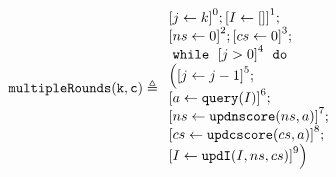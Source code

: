 %
\begin{figure}
\centering
\begin{subfigure}{0.3\textwidth}
    $
\kw{multipleRounds(k, c)} \triangleq
\begin{array}{l}
    \clabel{\assign{j}{k}}^0;
    \clabel{\assign{I}{[]}}^1; \\
    \clabel{\assign{ns}{0}}^2; 
    \clabel{\assign{cs}{0}}^3; \\
    \ewhile ~ \clabel{j > 0}^{4} ~ \edo ~ \\
    \Big(
    \clabel{\assign{j}{j-1}}^{5} ;\\
    \clabel{\assign{a}{\query(I)}}^6; \\
    \clabel{\assign{ns}{\kw{updnscore}(ns, a)}}^7; \\
    \clabel{\assign{cs}{\kw{updcscore}(cs, a)}}^8; \\
    \clabel{\assign{I}{\kw{updI}(I, ns, cs)}}^9
    \Big) 
\end{array}
    $
    \caption{}
\end{subfigure}
%

\end{figure}
